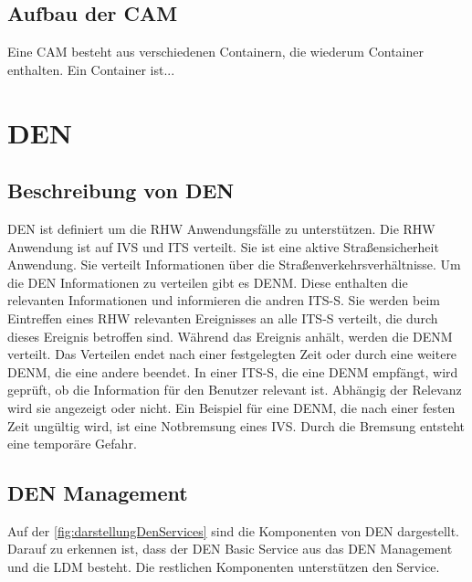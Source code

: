 \subsection{Aufbau der CAM}
Eine \ac{CAM} besteht aus verschiedenen Containern, die wiederum Container enthalten. Ein Container ist...

\section{DEN\label{sec:den}}
\subsection{Beschreibung von DEN \label{facilityLayer_beschreibungDEN}}
\ac{DEN} ist definiert um die \ac{RHW} Anwendungsfälle zu unterstützen.	Die \ac{RHW} Anwendung ist auf \ac{IVS} und \ac{ITS} verteilt. Sie ist eine aktive Straßensicherheit Anwendung. Sie verteilt Informationen über die Straßenverkehrsverhältnisse. Um die \ac{DEN} Informationen zu verteilen gibt es \ac{DENM}. Diese enthalten die relevanten Informationen und informieren die andren \ac{ITS-S}. Sie werden beim Eintreffen eines \ac{RHW} relevanten Ereignisses an alle \ac{ITS-S} verteilt, die durch dieses Ereignis betroffen sind. Während das Ereignis anhält, werden die \ac{DENM} verteilt. Das Verteilen endet nach einer festgelegten Zeit oder durch eine weitere \ac{DENM}, die eine andere beendet. In einer \ac{ITS-S}, die eine \ac{DENM} empfängt, wird geprüft, ob die Information für den Benutzer relevant ist. Abhängig der Relevanz wird sie angezeigt oder nicht. Ein Beispiel für eine \ac{DENM}, die nach einer festen Zeit ungültig wird, ist eine Notbremsung eines \ac{IVS}. Durch die Bremsung entsteht eine temporäre Gefahr. 


\subsection{DEN Management}
Auf der \autoref{fig:darstellungDenServices} sind die Komponenten von \ac{DEN} dargestellt. Darauf zu erkennen ist, dass der \ac{DEN} Basic Service aus das \ac{DEN} Management und die \ac{LDM} besteht. Die restlichen Komponenten unterstützen den Service. 

